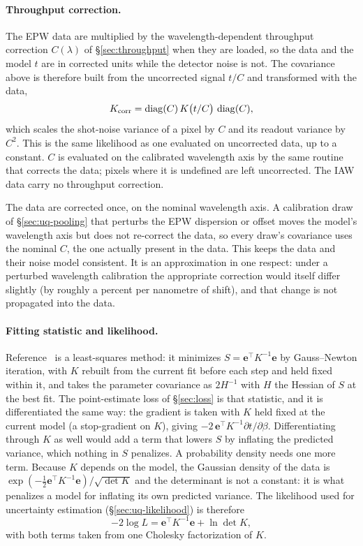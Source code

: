 \documentclass[11pt]{article}
\begin{document}
\paragraph{Throughput correction.} The EPW data are multiplied by the wavelength-dependent
throughput correction $C(\lambda)$ of \S\ref{sec:throughput} when they are loaded, so the
data and the model $t$ are in corrected units while the detector noise is not. The
covariance above is therefore built from the uncorrected signal $t/C$ and transformed
with the data,
\begin{equation}
  K_{\rm corr}=\operatorname{diag}(C)\,K\big(t/C\big)\,\operatorname{diag}(C),
\end{equation}
which scales the shot-noise variance of a pixel by $C$ and its readout variance by $C^2$.
This is the same likelihood as one evaluated on uncorrected data, up to a constant.
$C$ is evaluated on the calibrated wavelength axis by the same routine that corrects the
data; pixels where it is undefined are left uncorrected. The IAW data carry no throughput
correction.

The data are corrected once, on the nominal wavelength axis. A calibration draw of
\S\ref{sec:uq-pooling} that perturbs the EPW dispersion or offset moves the model's
wavelength axis but does not re-correct the data, so every draw's covariance uses the
nominal $C$, the one actually present in the data. This keeps the data and their noise
model consistent. It is an approximation in one respect: under a perturbed wavelength
calibration the appropriate correction would itself differ slightly (by roughly a percent
per nanometre of shift), and that change is not propagated into the data.

\paragraph{Fitting statistic and likelihood.} Reference~\cite{swadling2022} is a
least-squares method: it minimizes $S=\mathbf e^{\!\top}K^{-1}\mathbf e$ by Gauss--Newton
iteration, with $K$ rebuilt from the current fit before each step and held fixed within
it, and takes the parameter covariance as $2H^{-1}$ with $H$ the Hessian of $S$ at the
best fit. The point-estimate loss of \S\ref{sec:loss} is that statistic, and it is
differentiated the same way: the gradient is taken with $K$ held fixed at the current
model (a stop-gradient on $K$), giving $-2\,\mathbf e^{\!\top}K^{-1}\partial t/\partial\beta$.
Differentiating through $K$ as well would add a term that lowers $S$ by inflating the
predicted variance, which nothing in $S$ penalizes. A probability
density needs one more term. Because $K$ depends on the model, the Gaussian density of the
data is $\exp(-\tfrac12\mathbf e^{\!\top}K^{-1}\mathbf e)/\sqrt{\det K}$ and the
determinant is not a constant: it is what penalizes a model for inflating its own
predicted variance. The likelihood used for uncertainty estimation
(\S\ref{sec:uq-likelihood}) is therefore
\begin{equation}\label{eq:covar-likelihood}
  -2\log L=\mathbf e^{\!\top}K^{-1}\mathbf e+\ln\det K ,
\end{equation}
with both terms taken from one Cholesky factorization of $K$.
\end{document}
